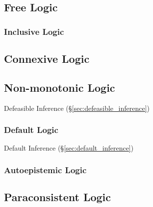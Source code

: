 \subsection{Free Logic}\label{sec:free_logic}

\subsubsection{Inclusive Logic}\label{sec:inclusive_logic}



\subsection{Connexive Logic}\label{sec:connexive_logic}

\subsection{Non-monotonic Logic}\label{sec:nonmonotonic_logic}

Defeasible Inference (\S\ref{sec:defeasible_inference})



\subsubsection{Default Logic}\label{sec:default_logic}

Default Inference (\S\ref{sec:default_inference})



\subsubsection{Autoepistemic Logic}\label{sec:autoepistemic_logic}



\subsection{Paraconsistent Logic}\label{sec:paraconsistent_logic}

